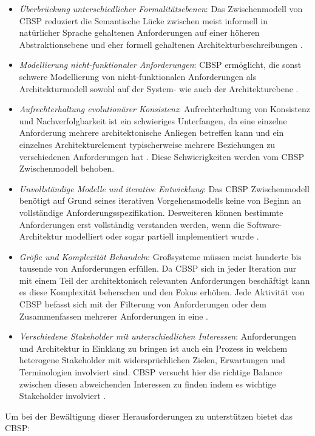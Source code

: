 \begin{itemize}
\item \textit{Überbrückung unterschiedlicher Formalitätsebenen}: Das Zwischenmodell von CBSP reduziert die Semantische Lücke zwischen meist informell in natürlicher Sprache gehaltenen Anforderungen auf einer höheren Abstraktionsebene und eher formell gehaltenen Architekturbeschreibungen \cite{Gru01}.
\item \textit{Modellierung nicht-funktionaler Anforderungen}: CBSP ermöglicht, die sonst schwere Modellierung von nicht-funktionalen Anforderungen als Architekturmodell sowohl auf der System- wie auch der Architekturebene \cite{Gru01}. 
\item \textit{Aufrechterhaltung evolutionärer Konsistenz}: Aufrechterhaltung von Konsistenz und Nachverfolgbarkeit ist ein schwieriges Unterfangen, da eine einzelne Anforderung mehrere architektonische Anliegen betreffen kann und ein einzelnes Architekturelement typischerweise mehrere Beziehungen zu verschiedenen Anforderungen hat \cite{Gru01}. Diese Schwierigkeiten werden vom CBSP Zwischenmodell behoben.
\item \textit{Unvollständige Modelle und iterative Entwicklung}: Das CBSP Zwischenmodell benötigt auf Grund seines iterativen Vorgehensmodells keine von Beginn an vollständige Anforderungsspezifikation. Desweiteren können bestimmte Anforderungen erst vollständig verstanden werden, wenn die Software-Architektur modelliert oder sogar partiell implementiert wurde \cite{Gru01}.
\item \textit{Größe und Komplexität Behandeln}: Großsysteme müssen meist hunderte bis tausende von Anforderungen erfüllen. Da CBSP sich in jeder Iteration nur mit einem Teil der architektonisch relevanten Anforderungen beschäftigt kann es diese Komplexität beherschen und den Fokus erhöhen. Jede Aktivität von CBSP befasst sich mit der Filterung von Anforderungen oder dem Zusammenfassen mehrerer Anforderungen in eine \cite{Gru01}.
\item \textit{Verschiedene Stakeholder mit unterschiedlichen Interessen}: Anforderungen und Architektur in Einklang zu bringen ist auch ein Prozess in welchem heterogene Stakeholder mit widersprüchlichen Zielen, Erwartungen und Terminologien involviert sind. CBSP versucht hier die richtige Balance zwischen diesen abweichenden Interessen zu finden indem es wichtige Stakeholder involviert \cite{Gru01}. \\
\end{itemize}

Um bei der Bewältigung dieser Herausforderungen zu unterstützen bietet das CBSP: \\

